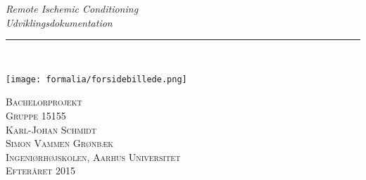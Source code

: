 \thispagestyle{empty}
\begin{flushright}
\vspace{3cm}

\phantom{hul}

\phantom{hul}

\phantom{hul}

\textsl{\Huge Remote Ischemic Conditioning} \\ \vspace{1cm}
\textsl{\Huge Udviklingsdokumentation} \\ \vspace{1cm}

\rule{\textwidth}{3mm} \\ \vspace{1.5cm}
\vspace{1cm}

\texttt{[image: formalia/forsidebillede.png]}

\vspace{1cm} 
\textsc{\Large Bachelorprojekt \\
Gruppe 15155 \\
Karl-Johan Schmidt \\
Simon Vammen Grønbæk \\
Ingeniørhøjskolen, Aarhus Universitet \\
Efteråret 2015 \\}
\end{flushright}
